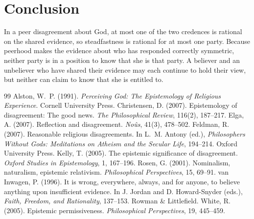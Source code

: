 \documentclass{situationist-preprint}
\begin{document}
\section{Conclusion}

In a peer disagreement about God, at most one of the two credences is rational on the shared evidence, so steadfastness is rational for at most one party. Because peerhood makes the evidence about who has responded correctly symmetric, neither party is in a position to know that she is that party. A believer and an unbeliever who have shared their evidence may each continue to hold their view, but neither can claim to know that she is entitled to.

\begin{thebibliography}{99}\small
{} Alston, W.~P. (1991). \emph{Perceiving God: The Epistemology of Religious Experience}. Cornell University Press.
 Christensen, D. (2007). Epistemology of disagreement: The good news. \emph{The Philosophical Review}, 116(2), 187--217.
 Elga, A. (2007). Reflection and disagreement. \emph{No\^us}, 41(3), 478--502.
 Feldman, R. (2007). Reasonable religious disagreements. In L.~M. Antony (ed.), \emph{Philosophers Without Gods: Meditations on Atheism and the Secular Life}, 194--214. Oxford University Press.
 Kelly, T. (2005). The epistemic significance of disagreement. \emph{Oxford Studies in Epistemology}, 1, 167--196.
 Rosen, G. (2001). Nominalism, naturalism, epistemic relativism. \emph{Philosophical Perspectives}, 15, 69--91.
 van Inwagen, P. (1996). It is wrong, everywhere, always, and for anyone, to believe anything upon insufficient evidence. In J. Jordan and D. Howard-Snyder (eds.), \emph{Faith, Freedom, and Rationality}, 137--153. Rowman \& Littlefield.
 White, R. (2005). Epistemic permissiveness. \emph{Philosophical Perspectives}, 19, 445--459.
\end{thebibliography}
\end{document}
